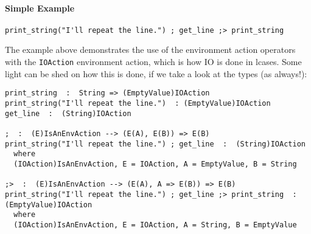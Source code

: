 \documentclass{article}
\begin{document}
\paragraph{Simple Example}
\begin{verbatim}
print_string("I'll repeat the line.") ; get_line ;> print_string
\end{verbatim}
The example above demonstrates the use of the environment action operators with
the \texttt{IOAction} environment action, which is how IO is done in
lcases. Some light can be shed on how this is done, if we take a look at the
types (as always!):
\begin{verbatim}
print_string  :  String => (EmptyValue)IOAction
print_string("I'll repeat the line.")  : (EmptyValue)IOAction
get_line  :  (String)IOAction

;  :  (E)IsAnEnvAction --> (E(A), E(B)) => E(B) 
print_string("I'll repeat the line.") ; get_line  :  (String)IOAction
  where
  (IOAction)IsAnEnvAction, E = IOAction, A = EmptyValue, B = String

;>  :  (E)IsAnEnvAction --> (E(A), A => E(B)) => E(B) 
print_string("I'll repeat the line.") ; get_line ;> print_string  :  (EmptyValue)IOAction
  where
  (IOAction)IsAnEnvAction, E = IOAction, A = String, B = EmptyValue
\end{verbatim}
\end{document}
